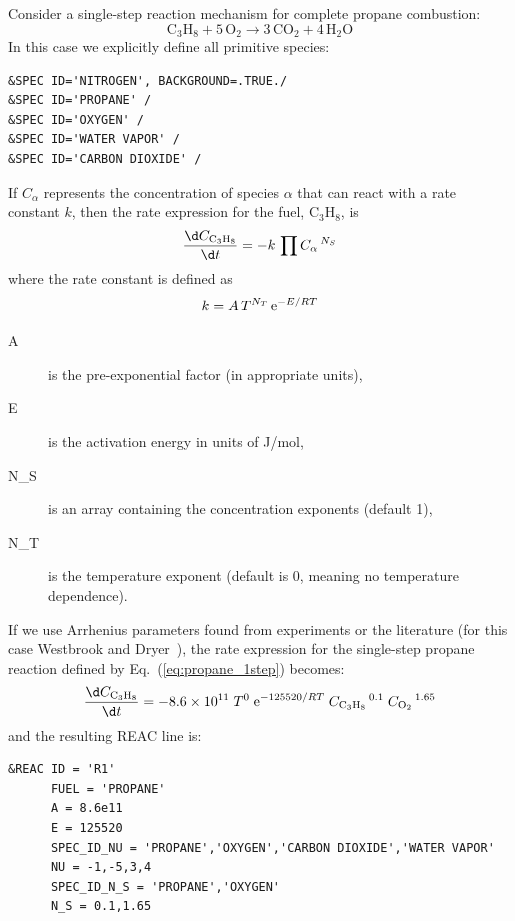 \documentclass[11pt]{book}
\begin{document}
Consider a single-step reaction mechanism for complete propane combustion:
\begin{equation}\label{eq:propane_1step}
\mathrm{C_3H_8 + 5\,O_{2} \rightarrow 3\,CO_{2} + 4\,H_{2}O}
\end{equation}
In this case we explicitly define all primitive species:

\begin{lstlisting}
&SPEC ID='NITROGEN', BACKGROUND=.TRUE./
&SPEC ID='PROPANE' /
&SPEC ID='OXYGEN' /
&SPEC ID='WATER VAPOR' /
&SPEC ID='CARBON DIOXIDE' /
\end{lstlisting}
If $C_{\alpha}$ represents the concentration of species $\alpha$ that can react with a rate constant $k$, then the rate expression for the fuel, $\mathrm{C_3H_8}$, is
\begin{equation}\label{eq:finite_rate}
\frac{\d C_{\mathrm{C_3H_8}}}{\d t}= -k \, \prod C_{\alpha}\,^{N_S}
\end{equation}
where the rate constant is defined as
\begin{equation}\label{eq:reac_rate}
k = A \, T^{N_{T}} \, {\rm e}^{-E/RT}
\end{equation}
\begin{description}
\item[{\ct A}] is the pre-exponential factor (in appropriate units),
\item[{\ct E}] is the activation energy in units of J/mol,
\item[{\ct N\_S}] is an array containing the concentration exponents (default 1),
\item[{\ct N\_T}] is the temperature exponent (default is 0, meaning no temperature dependence).
\end{description}

If we use Arrhenius parameters found from experiments or the literature (for this case Westbrook and Dryer~\cite{Westbrook:1}), the rate expression for the single-step propane reaction defined by Eq.~(\ref{eq:propane_1step}) becomes:
\begin{equation}\label{eq:reac_rate2}
\frac{\d C_{\mathrm{C_3H_8}}}{\d t} = -8.6 \times 10^{11} \; T^{0} \; {\rm e}^{-125520/RT} \; C_{\mathrm{C_3H_8}}\,^{0.1} \; C_{\mathrm{O_2}}\,^{1.65}
\end{equation}
and the resulting {\ct REAC} line is:

\begin{lstlisting}
&REAC ID = 'R1'
      FUEL = 'PROPANE'
      A = 8.6e11
      E = 125520
      SPEC_ID_NU = 'PROPANE','OXYGEN','CARBON DIOXIDE','WATER VAPOR'
      NU = -1,-5,3,4
      SPEC_ID_N_S = 'PROPANE','OXYGEN'
      N_S = 0.1,1.65
\end{lstlisting}
\end{document}
